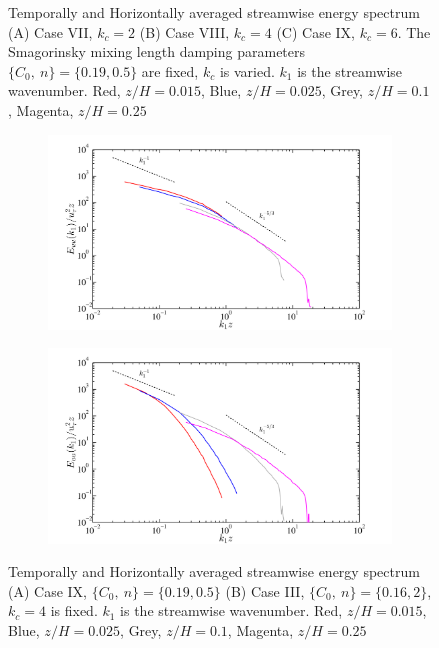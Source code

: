 \begin{figure}[h!]
\begin{subfigure}[t]{0.70\textwidth}
                \caption{}
                \label{fig:spec3}
        \end{subfigure}        
        \caption[1D Energy Spectra 1]{ Temporally and Horizontally averaged streamwise energy spectrum (A) Case VII, $k_c = 2$ (B) Case VIII, $k_c = 4$ (C) Case IX, $k_c = 6$. The Smagorinsky mixing length damping parameters $\lbrace C_0, \ n \rbrace = \lbrace 0.19, 0.5\rbrace$ are fixed, $k_c$ is varied. $k_1$ is the streamwise wavenumber. Red, $z/H = 0.015$, Blue, $z/H = 0.025$, Grey, $z/H = 0.1$, Magenta, $z/H = 0.25$ }\label{fig:stat0_lotw2}
\end{figure}
        
   \begin{figure}        
\centering
          \begin{subfigure}[t]{0.70\textwidth}
                \includegraphics[width=\linewidth]{Fig2/energy_ABL_n05_filt4.pdf}
                \caption{}
                \label{fig:spec4}
        \end{subfigure}   
\centering
          \begin{subfigure}[t]{0.70\textwidth}
                \includegraphics[width=\linewidth]{Fig2/energy_ABL_n2_filt4.pdf}
                \caption{}
                \label{fig:spec5}
        \end{subfigure}           
        \caption[1D Energy Spectra 2]{Temporally and Horizontally averaged streamwise energy spectrum (A) Case IX, $\lbrace C_0, \ n \rbrace = \lbrace 0.19 , 0.5 \rbrace$ (B) Case III, $\lbrace C_0, \ n \rbrace = \lbrace 0.16 , 2 \rbrace$, $k_c = 4$ is fixed. $k_1$ is the streamwise wavenumber. Red, $z/H = 0.015$, Blue, $z/H = 0.025$, Grey, $z/H = 0.1$, Magenta, $z/H = 0.25$  }\label{fig:stat0_lotw3}
\end{figure}

